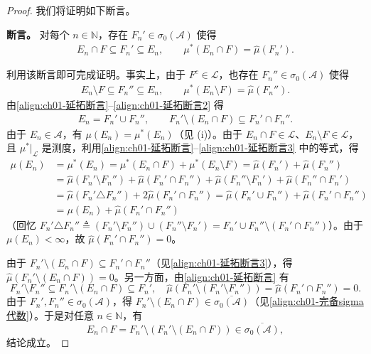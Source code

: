 \documentclass[../../main.tex]{subfiles}%
\begin{document}
\begin{proof}
我们将证明如下断言。

\textbf{断言。} 对每个 $n\in\mathbb{N}$，存在 $F_n'\in\sigma_0(\mathcal{A})$ 使得
\begin{align}
E_n\cap F\subseteq F_n'\subseteq E_n,\qquad\mu^*(E_n\cap F)=\widehat{\mu}(F_n'). \label{align:ch01-延拓断言}
\end{align}

利用该断言即可完成证明。事实上，由于 $F^c\in\mathcal{L}$，也存在 $F_n''\in\sigma_0(\mathcal{A})$ 使得
\begin{align}
E_n\setminus F\subseteq F_n''\subseteq E_n,\qquad\mu^*(E_n\setminus F)=\widehat{\mu}(F_n''). \label{align:ch01-延拓断言2}
\end{align}
由\eqref{align:ch01-延拓断言}--\eqref{align:ch01-延拓断言2} 得
\begin{align}
E_n=F_n'\cup F_n'',\qquad F_n'\setminus(E_n\cap F)\subseteq F_n'\cap F_n''. \label{align:ch01-延拓断言3}
\end{align}
由于 $E_n\in\mathcal{A}$，有 $\mu(E_n)=\mu^*(E_n)$（见 (i)）。由于 $E_n\cap F\in\mathcal{L}$、$E_n\setminus F\in\mathcal{L}$，且 $\mu^*|_{\mathcal{L}}$ 是测度，利用\eqref{align:ch01-延拓断言}--\eqref{align:ch01-延拓断言3} 中的等式，得
\[
\begin{aligned}
\mu(E_n)&=\mu^*(E_n)=\mu^*(E_n\cap F)+\mu^*(E_n\setminus F)
=\widehat{\mu}(F_n')+\widehat{\mu}(F_n'')\\
&=\widehat{\mu}(F_n'\setminus F_n'')+\widehat{\mu}(F_n'\cap F_n'')
+\widehat{\mu}(F_n''\setminus F_n')+\widehat{\mu}(F_n''\cap F_n')\\
&=\widehat{\mu}(F_n'\triangle F_n'')+2\widehat{\mu}(F_n'\cap F_n'')
=\widehat{\mu}(F_n'\cup F_n'')+\widehat{\mu}(F_n'\cap F_n'')\\
&=\mu(E_n)+\widehat{\mu}(F_n'\cap F_n'')
\end{aligned}
\]
（回忆 $F_n'\triangle F_n''\triangleq (F_n'\setminus F_n'')\cup(F_n''\setminus F_n')=F_n'\cup F_n''\setminus(F_n'\cap F_n'')$）。由于 $\mu(E_n)<\infty$，故 $\widehat{\mu}(F_n'\cap F_n'')=0$。

由于 $F_n'\setminus(E_n\cap F)\subseteq F_n'\cap F_n''$（见\eqref{align:ch01-延拓断言3}），得 $\widehat{\mu}(F_n'\setminus(E_n\cap F))=0$。另一方面，由\eqref{align:ch01-延拓断言} 有
\[
F_n'\setminus F_n''\subseteq F_n'\setminus(E_n\cap F)\subseteq F_n',\quad
\widehat{\mu}(F_n'\setminus(F_n'\setminus F_n''))=\widehat{\mu}(F_n'\cap F_n'')=0.
\]
由于 $F_n',F_n''\in\sigma_0(\mathcal{A})$，得 $F_n'\setminus(E_n\cap F)\in\overline{\sigma_0(\mathcal{A})}$（见\eqref{align:ch01-完备sigma代数}）。于是对任意 $n\in\mathbb{N}$，有
\[
E_n\cap F=F_n'\setminus(F_n'\setminus(E_n\cap F))\in\overline{\sigma_0(\mathcal{A})},
\]
结论成立。


\end{proof}
\end{document}

